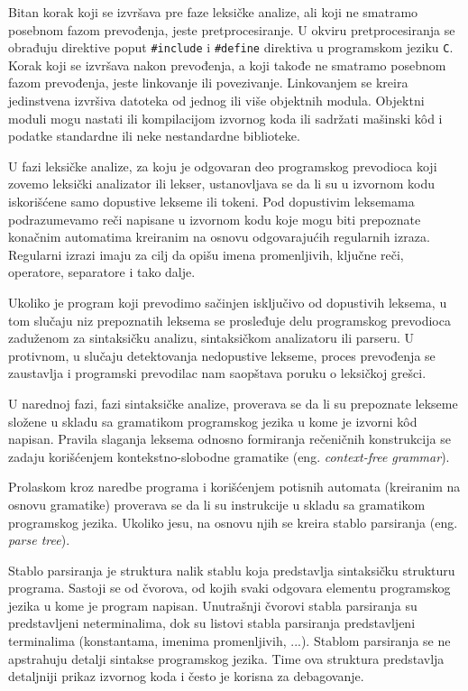 \documentclass[12pt,oneside]{memoir}
\begin{document}
Bitan korak koji se izvršava pre faze leksičke analize, ali koji ne smatramo posebnom fazom prevođenja, jeste pretprocesiranje. U okviru pretprocesiranja se obrađuju direktive poput \texttt{\#include} i \texttt{\#define} direktiva u programskom jeziku \texttt{C}. Korak koji se izvršava nakon prevođenja, a koji takođe ne smatramo posebnom fazom prevođenja, jeste linkovanje ili povezivanje. Linkovanjem se kreira jedinstvena izvršiva datoteka od jednog ili više objektnih modula. Objektni moduli mogu nastati ili kompilacijom izvornog koda ili sadržati mašinski k\^od i podatke standardne ili neke nestandardne biblioteke.

U fazi leksičke analize, za koju je odgovaran deo programskog prevodioca koji zovemo leksički 
analizator ili lekser, ustanovljava se da li su u izvornom kodu iskorišćene samo dopustive 
lekseme ili tokeni. Pod dopustivim leksemama podrazumevamo reči napisane u izvornom kodu 
koje mogu biti prepoznate konačnim automatima kreiranim na osnovu odgovarajućih regularnih 
izraza. Regularni izrazi imaju za cilj da opišu imena promenljivih, ključne reči, operatore, 
separatore i tako dalje. 

Ukoliko je program koji prevodimo sačinjen isključivo od dopustivih 
leksema, u tom slučaju niz prepoznatih leksema se prosleđuje delu programskog 
prevodioca zaduženom za sintaksičku analizu, sintaksičkom analizatoru ili parseru. U 
protivnom, u slučaju detektovanja nedopustive lekseme, proces prevođenja se zaustavlja 
i programski prevodilac nam saopštava poruku o leksičkoj grešci. 

U narednoj fazi, fazi sintaksičke analize, proverava se da li su prepoznate lekseme složene u 
skladu sa gramatikom programskog jezika u kome je izvorni k\^od napisan. 
Pravila slaganja leksema odnosno formiranja rečeničnih konstrukcija se zadaju korišćenjem 
kontekstno-slobodne gramatike (eng. \textit{context-free grammar}). 

Prolaskom kroz naredbe programa i korišćenjem potisnih automata (kreiranim na osnovu gramatike) proverava se da li su instrukcije u skladu sa gramatikom programskog jezika. Ukoliko jesu, na osnovu njih se kreira stablo parsiranja (eng. \textit{parse tree}). 

Stablo parsiranja je struktura nalik stablu koja predstavlja sintaksičku strukturu programa. Sastoji se od čvorova, od kojih svaki odgovara elementu programskog jezika u kome je program napisan. Unutrašnji čvorovi stabla parsiranja su predstavljeni neterminalima, dok su listovi stabla parsiranja predstavljeni terminalima (konstantama, imenima promenljivih, ...). Stablom parsiranja se ne apstrahuju detalji sintakse programskog jezika. Time ova struktura predstavlja detaljniji prikaz izvornog koda i često je korisna za debagovanje. 
\end{document}
